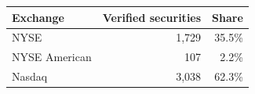 \begin{tabular}{@{}lrr@{}}
\toprule
Exchange & Verified securities & Share \\
\midrule
NYSE & 1,729 & 35.5\% \\
NYSE American & 107 & 2.2\% \\
Nasdaq & 3,038 & 62.3\% \\
\bottomrule
\end{tabular}
